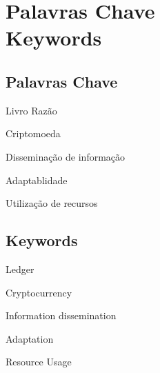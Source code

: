 \chapter*{Palavras Chave\\Keywords}

\section*{Palavras Chave}

Livro Razão

Criptomoeda

Disseminação de informação

Adaptablidade

Utilização de recursos

\section*{Keywords}

Ledger

Cryptocurrency

Information dissemination

Adaptation

Resource Usage
